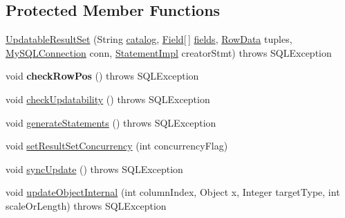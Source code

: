 \subsection*{Protected Member Functions}
\begin{DoxyCompactItemize}
\item 
\mbox{\hyperlink{classcom_1_1mysql_1_1jdbc_1_1_updatable_result_set_a6d5d18456bae52651db9e6040ed3955a}{Updatable\+Result\+Set}} (String \mbox{\hyperlink{classcom_1_1mysql_1_1jdbc_1_1_result_set_impl_ae05d8a0ad69c96645b783537100fb95c}{catalog}}, \mbox{\hyperlink{classcom_1_1mysql_1_1jdbc_1_1_field}{Field}}\mbox{[}$\,$\mbox{]} \mbox{\hyperlink{classcom_1_1mysql_1_1jdbc_1_1_result_set_impl_a5da5c6ef8d035aa65884115a2f7daf67}{fields}}, \mbox{\hyperlink{interfacecom_1_1mysql_1_1jdbc_1_1_row_data}{Row\+Data}} tuples, \mbox{\hyperlink{interfacecom_1_1mysql_1_1jdbc_1_1_my_s_q_l_connection}{My\+S\+Q\+L\+Connection}} conn, \mbox{\hyperlink{classcom_1_1mysql_1_1jdbc_1_1_statement_impl}{Statement\+Impl}} creator\+Stmt)  throws S\+Q\+L\+Exception 
\item 
\mbox{\label{classcom_1_1mysql_1_1jdbc_1_1_updatable_result_set_a98452febfc80a7f449471c5d6e598a5a}} 
void {\bfseries check\+Row\+Pos} ()  throws S\+Q\+L\+Exception 
\item 
void \mbox{\hyperlink{classcom_1_1mysql_1_1jdbc_1_1_updatable_result_set_a35f949d95ff9b1a60f1974f6f374a186}{check\+Updatability}} ()  throws S\+Q\+L\+Exception 
\item 
void \mbox{\hyperlink{classcom_1_1mysql_1_1jdbc_1_1_updatable_result_set_a88b1ef00b296c3cb026dc9c265f137f7}{generate\+Statements}} ()  throws S\+Q\+L\+Exception 
\item 
void \mbox{\hyperlink{classcom_1_1mysql_1_1jdbc_1_1_updatable_result_set_ab0dbcb7c08c1f009f8bbfdce7e41158c}{set\+Result\+Set\+Concurrency}} (int concurrency\+Flag)
\item 
void \mbox{\hyperlink{classcom_1_1mysql_1_1jdbc_1_1_updatable_result_set_a8504fb4ab23940b812d45b460a44318d}{sync\+Update}} ()  throws S\+Q\+L\+Exception 
\item 
void \mbox{\hyperlink{classcom_1_1mysql_1_1jdbc_1_1_updatable_result_set_ad401023491c0c0dcb52ae3e4f731e9f7}{update\+Object\+Internal}} (int column\+Index, Object x, Integer target\+Type, int scale\+Or\+Length)  throws S\+Q\+L\+Exception 
\end{DoxyCompactItemize}
